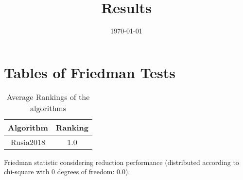 \documentclass{article}
\title{Results}
\author{}
\date{\today}
\begin{document}
\oddsidemargin 0in \topmargin 0in\maketitle
\section{Tables of Friedman Tests}
\begin{table}[!htp]
\centering
\caption{Average Rankings of the algorithms
}\begin{tabular}{c|c}
Algorithm&Ranking\\
\hline
Rusia2018&1.0\\
\end{tabular}
\end{table}


Friedman statistic considering reduction performance (distributed according to chi-square with 0 degrees of freedom: 0.0).
\end{document}

